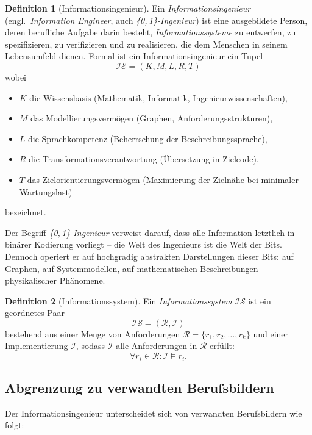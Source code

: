 ﻿\documentclass[a4paper,12pt]{article}
\theoremstyle{definition}
\newtheorem{definition}{Definition}
\begin{document}
\begin{definition}[Informationsingenieur]
\label{def:infeng}
Ein \emph{Informationsingenieur} (engl.\ \emph{Information Engineer}, auch
\emph{\{0,\,1\}-Ingenieur}) ist eine ausgebildete Person, deren berufliche Aufgabe darin
besteht, \emph{Informationssysteme} zu entwerfen, zu spezifizieren, zu verifizieren und zu
realisieren, die dem Menschen in seinem Lebensumfeld dienen.
Formal ist ein Informationsingenieur ein Tupel
\[
  \mathcal{IE} = (K, M, L, R, T)
\]
wobei
\begin{itemize}
  \item $K$ die Wissensbasis (Mathematik, Informatik, Ingenieurwissenschaften),
  \item $M$ das Modellierungsvermögen (Graphen, Anforderungsstrukturen),
  \item $L$ die Sprachkompetenz (Beherrschung der Beschreibungssprache),
  \item $R$ die Transformationsverantwortung (Übersetzung in Zielcode),
  \item $T$ das Zielorientierungsvermögen (Maximierung der Zielnähe bei minimaler Wartungslast)
\end{itemize}
bezeichnet.
\end{definition}

Der Begriff \emph{\{0,\,1\}-Ingenieur} verweist darauf, dass alle Information letztlich in
binärer Kodierung vorliegt -- die Welt des Ingenieurs ist die Welt der Bits. Dennoch operiert
er auf hochgradig abstrakten Darstellungen dieser Bits: auf Graphen, auf Systemmodellen, auf
mathematischen Beschreibungen physikalischer Phänomene.

\begin{definition}[Informationssystem]
\label{def:infosys}
Ein \emph{Informationssystem} $\mathcal{IS}$ ist ein geordnetes Paar
\[
  \mathcal{IS} = (\mathcal{R}, \mathcal{I})
\]
bestehend aus einer Menge von Anforderungen $\mathcal{R} = \{r_1, r_2, \ldots, r_k\}$ und
einer Implementierung $\mathcal{I}$, sodass $\mathcal{I}$ alle Anforderungen in $\mathcal{R}$
erfüllt:
\[
  \forall r_i \in \mathcal{R}: \mathcal{I} \models r_i.
\]
\end{definition}

\subsection{Abgrenzung zu verwandten Berufsbildern}

Der Informationsingenieur unterscheidet sich von verwandten Berufsbildern wie folgt:
\end{document}
